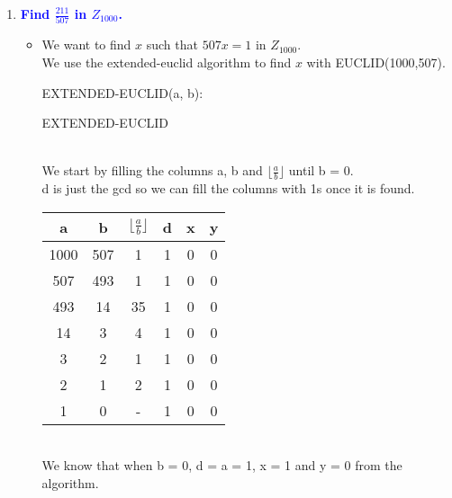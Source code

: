 \documentclass[11pt]{article}
\begin{document}
\begin{enumerate}
\item \textbf{\textcolor{blue}{Find $\frac{211}{507}$ in $Z_{1000}$.}}
    \begin{itemize}
        \item We want to find $x$ such that $507x = 1$ in $Z_{1000}$.
            \\ We use the extended-euclid algorithm to find $x$ with EUCLID(1000,507).
            \begin{algorithm}
            EXTENDED-EUCLID(a, b): \\
            \caption{EXTENDED-EUCLID}
            \end{algorithm}
            \\ We start by filling the columns a, b and ${\lfloor}\frac{a}{b}{\rfloor}$ until b = 0.
            \\ d is just the gcd so we can fill the columns with 1s once it is found. \\
            \begin{center}
            \begin{tabular}{| c | c | c | c | c | c |} 
            \hline
            a & b & ${\lfloor}\frac{a}{b}{\rfloor}$ & d & x & y \\
            \hline
            1000 & 507 & 1 & 1 & 0 & 0 \\
            507 & 493 & 1 & 1 & 0 & 0 \\
            493 & 14 & 35 & 1 & 0 & 0 \\
            14 & 3 & 4 & 1 & 0 & 0 \\
            3 & 2 & 1 & 1 & 0 & 0 \\
            2 & 1 & 2 & 1 & 0 & 0 \\
            1 & 0 & - & 1 & 0 & 0 \\
            \hline
            \end{tabular}
            \end{center}
            \\ We know that when b = 0, d = a = 1, x = 1 and y = 0 from the algorithm. \\

\end{itemize}
\end{enumerate}
\end{document}
